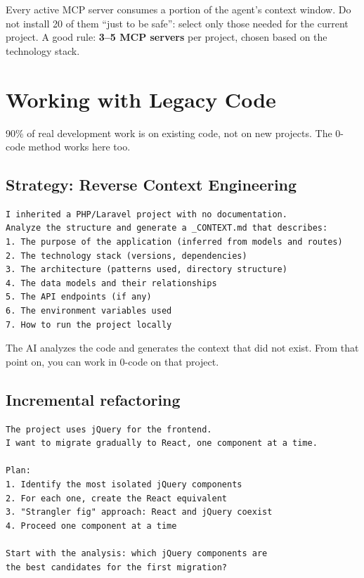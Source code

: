 \begin{warnbox}
Every active MCP server consumes a portion of the agent's context window. Do not install 20 of them ``just to be safe'': select only those needed for the current project. A good rule: \textbf{3--5 MCP servers} per project, chosen based on the technology stack.
\end{warnbox}

\section{Working with Legacy Code}

90\% of real development work is on existing code, not on new projects. The 0-code method works here too.

\subsection{Strategy: Reverse Context Engineering}

\begin{lstlisting}[language={}]
I inherited a PHP/Laravel project with no documentation.
Analyze the structure and generate a _CONTEXT.md that describes:
1. The purpose of the application (inferred from models and routes)
2. The technology stack (versions, dependencies)
3. The architecture (patterns used, directory structure)
4. The data models and their relationships
5. The API endpoints (if any)
6. The environment variables used
7. How to run the project locally
\end{lstlisting}

The AI analyzes the code and generates the context that did not exist. From that point on, you can work in 0-code on that project.

\subsection{Incremental refactoring}

\begin{lstlisting}[language={}]
The project uses jQuery for the frontend.
I want to migrate gradually to React, one component at a time.

Plan:
1. Identify the most isolated jQuery components
2. For each one, create the React equivalent
3. "Strangler fig" approach: React and jQuery coexist
4. Proceed one component at a time

Start with the analysis: which jQuery components are
the best candidates for the first migration?
\end{lstlisting}

